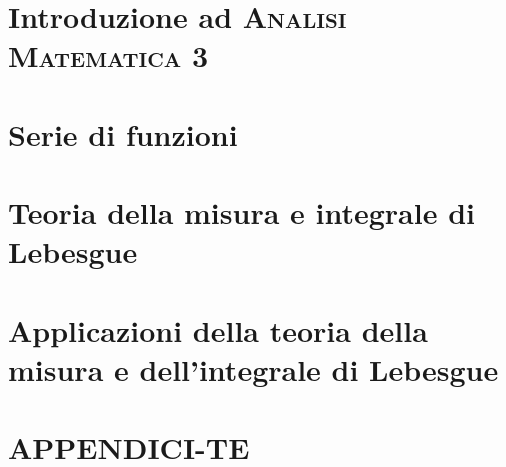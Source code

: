 \documentclass[a4paper, 11pt, twoside, openright, italian]{memoir}
\begin{document}
\frontmatter




\mainmatter

\part{Introduzione ad \textsc{Analisi Matematica 3}}

\part{Serie di funzioni}



\part{Teoria della misura e integrale di Lebesgue}


\part{Applicazioni della teoria della misura e dell'integrale di Lebesgue}



\appendix
\part{APPENDICI-TE}


%

%
\backmatter

\end{document}
